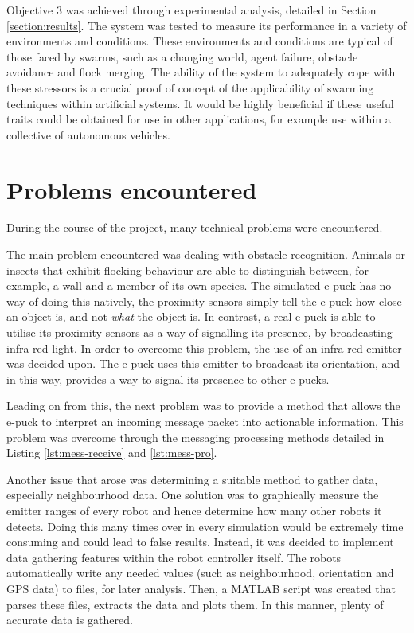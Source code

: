 Objective 3 was achieved through experimental analysis, detailed in Section \ref{section:results}. The system was tested to measure its performance in a variety of environments and conditions. These environments and conditions are typical of those faced by swarms, such as a changing world, agent failure, obstacle avoidance and flock merging. The ability of the system to adequately cope with these stressors is a crucial proof of concept of the applicability of swarming techniques within artificial systems. It would be highly beneficial if these useful traits could be obtained for use in other applications, for example use within a collective of autonomous vehicles.


\section{Problems encountered}

During the course of the project, many technical problems were encountered.

The main problem encountered was dealing with obstacle recognition. Animals or insects that exhibit flocking behaviour are able to distinguish between, for example, a wall and a member of its own species. The simulated e-puck has no way of doing this natively, the proximity sensors simply tell the e-puck how close an object is, and not \textit{what} the object is. In contrast, a real e-puck is able to utilise its proximity sensors as a way of signalling its presence, by broadcasting infra-red light. In order to overcome this problem, the use of an infra-red emitter was decided upon. The e-puck uses this emitter to broadcast its orientation, and in this way, provides a way to signal its presence to other e-pucks.

Leading on from this, the next problem was to provide a method that allows the e-puck to interpret an incoming message packet into actionable information. This problem was overcome through the messaging processing methods detailed in Listing \ref{lst:mess-receive} and \ref{lst:mess-pro}. 

Another issue that arose was determining a suitable method to gather data, especially neighbourhood data. One solution was to graphically measure the emitter ranges of every robot and hence determine how many other robots it detects. Doing this many times over in every simulation would be extremely time consuming and could lead to false results. Instead, it was decided to implement data gathering features within the robot controller itself. The robots automatically write any needed values (such as neighbourhood, orientation and GPS data) to files, for later analysis. Then, a MATLAB script was created that parses these files, extracts the data and plots them. In this manner, plenty of accurate data is gathered.


